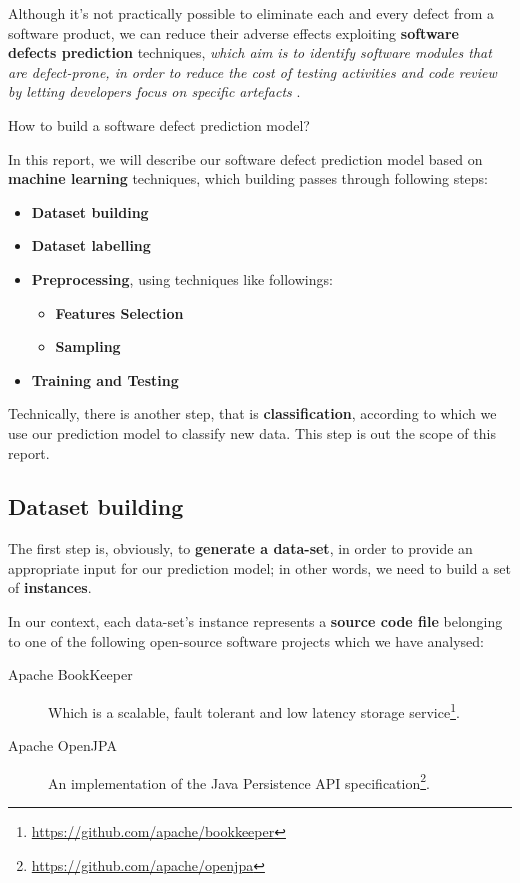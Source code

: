 \documentclass[sigconf]{acmart}
\begin{document}
Although it's not practically possible to eliminate each and every defect from a software product, we can reduce their adverse effects exploiting \textbf{software defects prediction} techniques, \textit{which aim is to identify software modules that are defect-prone, in order to reduce the cost of testing activities and code review by letting developers focus on specific artefacts} \citep{Falessi}.

How to build a software defect prediction model? 

In this report, we will describe our software defect prediction model based on \textbf{machine learning} techniques, which building passes through following steps:

\begin{itemize}
\item \textbf{Dataset building}
\item \textbf{Dataset labelling}
\item \textbf{Preprocessing}, using techniques like followings: 
\begin{itemize}
\item \textbf{Features Selection}
\item \textbf{Sampling}
\end{itemize}

\item \textbf{Training and Testing}
\end{itemize}

Technically, there is another step, that is \textbf{classification}, according to which we use our prediction model to classify new data. This step is out the scope of this report.

\subsection{Dataset building}

The first step is, obviously, to \textbf{generate a data-set}, in order to provide an appropriate input for our prediction model; in other words, we need to build a set of \textbf{instances}. 

In our context, each data-set's instance represents a \textbf{source code file} belonging to one of the following open-source software projects which we have analysed:

\begin{description}
\item[Apache BookKeeper\texttrademark]Which is a scalable, fault tolerant and low latency storage service\footnote{\url{https://github.com/apache/bookkeeper}}.
\item[Apache OpenJPA\texttrademark]An implementation of the Java Persistence API specification\footnote{\url{https://github.com/apache/openjpa}}. 
\end{description}
\end{document}
